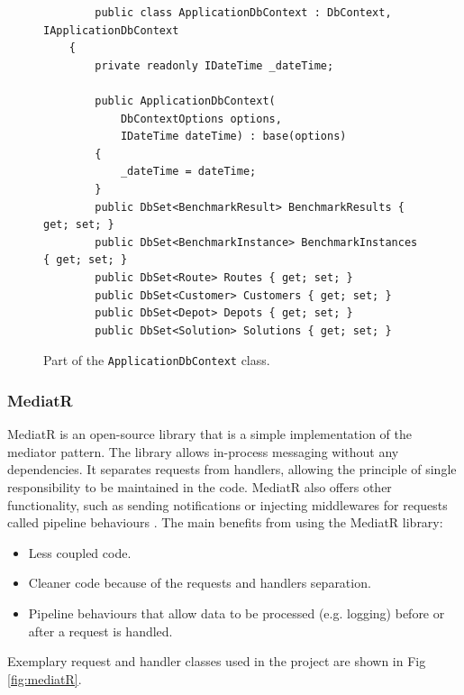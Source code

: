 \documentclass[a4paper,twoside,12pt]{book}
\begin{document}
\begin{figure}
\centering
\begin{lstlisting}
        public class ApplicationDbContext : DbContext, IApplicationDbContext
    {
        private readonly IDateTime _dateTime;

        public ApplicationDbContext(
            DbContextOptions options,
            IDateTime dateTime) : base(options)
        {
            _dateTime = dateTime;
        }
        public DbSet<BenchmarkResult> BenchmarkResults { get; set; }
        public DbSet<BenchmarkInstance> BenchmarkInstances { get; set; }
        public DbSet<Route> Routes { get; set; }
        public DbSet<Customer> Customers { get; set; }
        public DbSet<Depot> Depots { get; set; }
        public DbSet<Solution> Solutions { get; set; }
\end{lstlisting}
\caption{Part of the \lstinline|ApplicationDbContext| class.}
\label{fig:context}
\end{figure}

\subsubsection{MediatR}
MediatR is an open-source library that is a simple implementation of the mediator pattern. The library allows in-process messaging without any dependencies. It separates requests from handlers, allowing the principle of single responsibility to be maintained in the code.
MediatR also offers other functionality, such as sending notifications or injecting middlewares for requests called pipeline behaviours \cite{bib:mediatR}.
The main benefits from using the MediatR library: 
\begin{itemize}
\item Less coupled code.
\item Cleaner code because of the requests and handlers separation.
\item Pipeline behaviours that allow data to be processed (e.g. logging) before or after a request is handled.
\end{itemize}

Exemplary request and handler classes used in the project are shown in Fig \ref{fig:mediatR}.
\end{document}
